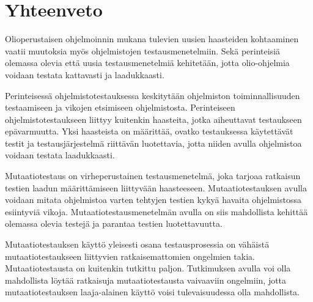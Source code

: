 \documentclass[finnish, grading]{tktltiki2}
\theoremstyle{definition}
\theoremstyle{remark}
\begin{document}


\section{Yhteenveto}

Olioperustaisen ohjelmoinnin mukana tulevien uusien haasteiden kohtaaminen vaatii muutoksia myös ohjelmistojen testausmenetelmiin. Sekä perinteisiä olemassa olevia että uusia testausmenetelmiä kehitetään, jotta olio-ohjelmia voidaan testata kattavasti ja laadukkaasti. 

Perinteisessä ohjelmistotestauksessa keskitytään ohjelmiston toiminnallisuuden testaamiseen ja vikojen etsimiseen ohjelmistosta. Perinteiseen ohjelmistotestaukseen liittyy kuitenkin haasteita, jotka aiheuttavat testaukseen epävarmuutta. Yksi haasteista on määrittää, ovatko testauksessa käytettävät testit ja testausjärjestelmä riittävän luotettavia, jotta niiden avulla ohjelmistoa voidaan testata laadukkaasti.

Mutaatiotestaus on virheperustainen testausmenetelmä, joka tarjoaa ratkaisun testien laadun määrittämiseen liittyvään haasteeseen. Mutaatiotestauksen avulla voidaan mitata ohjelmistoa varten tehtyjen testien kykyä havaita ohjelmistossa esiintyviä vikoja. Mutaatiotestausmenetelmän avulla on siis mahdollista kehittää olemassa olevia testejä ja parantaa testien luotettavuutta.

Mutaatiotestauksen käyttö yleisesti osana testausprosessia on vähäistä mutaatiotestaukseen liittyvien ratkaisemattomien ongelmien takia. Mutaatiotestausta on kuitenkin tutkittu paljon. Tutkimuksen avulla voi olla mahdollista löytää ratkaisuja mutaatiotestausta vaivaaviin ongelmiin, jotta mutaatiotestauksen laaja-alainen käyttö voisi tulevaisuudessa olla mahdollista.


\end{document}
